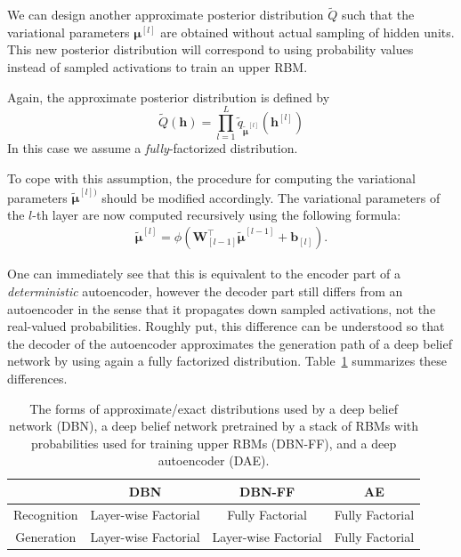 \documentclass[dissertation,nocontribution]{aaltoseries}
\newcommand{\qlay}[1]{\left[#1\right]}
\newcommand{\vect}[1]{\mathbf{#1}}
\newcommand{\vects}[1]{\boldsymbol{#1}}
\newcommand{\matr}[1]{\mathbf{#1}}
\newcommand{\vb}[0]{\vect{b}}
\newcommand{\vh}[0]{\vect{h}}
\newcommand{\mW}[0]{\matr{W}}
\newcommand{\vmu}[0]{\vects{\mu}}
\begin{document}
We can design another approximate posterior distribution
$\tilde{Q}$ such that the variational parameters
$\vmu^{\qlay{l}}$ are obtained without actual sampling of hidden
units. This new posterior distribution will correspond to
using probability values instead of sampled activations to
train an upper RBM.

Again, the approximate posterior distribution is defined by
\[
\tilde{Q}(\vh) = \prod_{l=1}^L \tilde{q}_{\tilde{\vmu}^{\qlay{l}}}\left(
\vh^{\qlay{l}} \right)
\]
In this case we assume a \textit{fully}-factorized
distribution. 

To cope with this assumption, the procedure for computing
the variational parameters $\tilde{\vmu}^{\qlay{l})}$ should
be modified accordingly.  The variational parameters of the
$l$-th layer are now computed recursively using the
following formula: 
\begin{align}
    \label{eq:dbn_posterior_ff}
    \tilde{\vmu}^{\qlay{l}} = \phi\left( \mW_{\qlay{l-1}}^\top
    \tilde{\vmu}^{\qlay{l-1}} + \vb_{\qlay{l}} \right).
\end{align}

One can immediately see that this is equivalent to the
encoder part of a \textit{deterministic} autoencoder, 
however the decoder part still differs from an autoencoder
in the sense that it propagates down sampled activations,
not the real-valued probabilities.  Roughly put, this
difference can be understood so that the decoder of the
autoencoder approximates the generation path of a deep
belief network by using again a fully factorized distribution.
Table~\ref{tbl:dbn_ae} summarizes these differences.

\begin{table}[h]
\vskip 0.15in
    \centering
    \begin{tabular}{c || c | c | c}
        & DBN & DBN-FF & AE \\
        \hline
        \hline
        Recognition & Layer-wise Factorial & Fully Factorial & Fully Factorial \\
        \hline
        Generation & Layer-wise Factorial & Layer-wise Factorial & Fully Factorial \\
    \end{tabular}
    \caption{The forms of approximate/exact 
    distributions used by a deep belief network (DBN), a
    deep belief network pretrained by a stack of RBMs with
    probabilities used for training upper RBMs (DBN-FF), and
    a deep autoencoder (DAE).}
    \label{tbl:dbn_ae}
\end{table}
\end{document}
